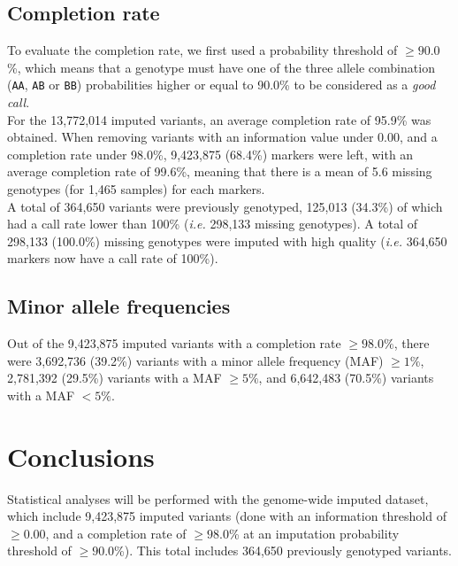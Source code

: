 \documentclass[10pt,twoside,english]{scrartcl}
\begin{document}
\pagebreak


\subsection{Completion rate}\label{subsec:completion_rate}


To evaluate the completion rate, we first used a probability threshold of
$\geq 90.0$\%, which means that a genotype must have one of
the three allele combination (\texttt{AA}, \texttt{AB} or \texttt{BB})
probabilities higher or equal to 90.0\% to be considered as a
\textit{good call}.\\

For the 13,772,014 imputed variants, an average completion rate of
95.9\% was obtained. When removing variants with an
information value under 0.00, and a completion rate under
98.0\%, 9,423,875 (68.4\%)
markers were left, with an average completion rate of
99.6\%, meaning that there is a mean of
5.6 missing genotypes (for 1,465 samples) for
each markers.\\

A total of 364,650 variants were previously genotyped,
125,013 (34.3\%) of
which had  a call rate lower than 100\% (\textit{i.e.} 298,133
missing genotypes). A total of 298,133
(100.0\%) missing genotypes were imputed with high
quality (\textit{i.e.} 364,650 markers now have a call
rate of 100\%).


\subsection{Minor allele frequencies}\label{subsec:maf}


Out of the 9,423,875 imputed variants with a completion rate
$\geq 98.0\%$, there were 3,692,736
(39.2\%) variants with a minor
allele frequency (MAF) $\geq 1\%$, 2,781,392
(29.5\%) variants with a MAF $\geq 5\%$, and
6,642,483 (70.5\%) variants with a MAF
$<5\%$.\\


\section{Conclusions}\label{sec:conclusions}


Statistical analyses will be performed with the genome-wide imputed dataset,
which include 9,423,875 imputed variants (done with an information
threshold of $\geq0.00$, and a completion rate of
$\geq98.0$\% at an imputation probability threshold of
$\geq90.0$\%). This total includes 364,650
previously genotyped variants.\\
\end{document}
